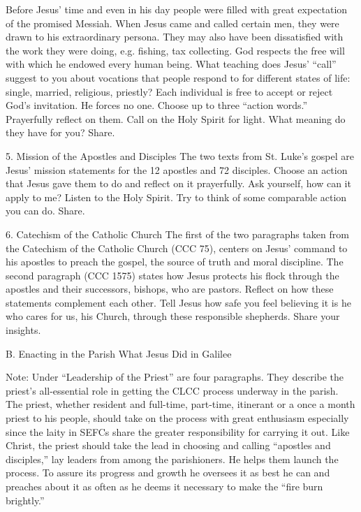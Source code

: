 \documentclass[oneside]{book}
\begin{document}
Before Jesus' time and even in his day people were filled with great expectation
of the promised Messiah. When Jesus came and called certain men, they were drawn
to his extraordinary persona. They may also have been dissatisfied with the work
they were doing, e.g. fishing, tax collecting. God respects the free will with
which he endowed every human being. What teaching does Jesus' ``call'' suggest
to you about vocations that people respond to for different states of life:
single, married, religious, priestly? Each individual is free to accept or
reject God's invitation. He forces no one. Choose up to three ``action words.''
Prayerfully reflect on them. Call on the Holy Spirit for light. What meaning do
they have for you? Share.

5. Mission of the Apostles and Disciples
The two texts from St. Luke's gospel are Jesus' mission statements for the 12
apostles and 72 disciples. Choose an action that Jesus gave them to do and
reflect on it prayerfully. Ask yourself, how can it apply to me? Listen to the
Holy Spirit. Try to think of some comparable action you can do. Share.

6. Catechism of the Catholic Church
The first of the two paragraphs taken from the Catechism of the Catholic Church
(CCC 75), centers on Jesus' command to his apostles to preach the gospel, the
source of truth and moral discipline. The second paragraph (CCC 1575) states how
Jesus protects his flock through the apostles and their successors, bishops, who
are pastors. Reflect on how these statements complement each other. Tell Jesus
how safe you feel believing it is he who cares for us, his Church, through these
responsible shepherds. Share your insights.

B. Enacting in the Parish What Jesus Did in Galilee

Note: Under ``Leadership of the Priest'' are four paragraphs. They describe the
priest's all-essential role in getting the CLCC process underway in the
parish. The priest, whether resident and full-time, part-time, itinerant or a
once a month priest to his people, should take on the process with great
enthusiasm especially since the laity in SEFCs share the greater responsibility
for carrying it out. Like Christ, the priest should take the lead in choosing
and calling ``apostles and disciples,'' lay leaders from among the
parishioners. He helps them launch the process. To assure its progress and
growth he oversees it as best he can and preaches about it as often as he deems
it necessary to make the ``fire burn brightly.''
\end{document}
